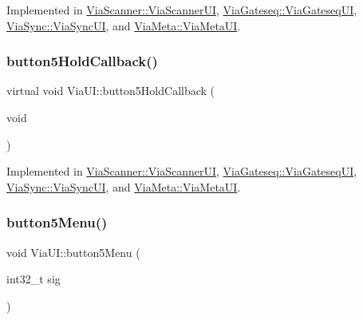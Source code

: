 Implemented in \mbox{\hyperlink{class_via_scanner_1_1_via_scanner_u_i_a337284dc48950fd3140b40ecca57122b}{Via\+Scanner\+::\+Via\+Scanner\+UI}}, \mbox{\hyperlink{class_via_gateseq_1_1_via_gateseq_u_i_a6286441705681c57d4f8535d0445b360}{Via\+Gateseq\+::\+Via\+Gateseq\+UI}}, \mbox{\hyperlink{class_via_sync_1_1_via_sync_u_i_ad02cd6e9495afcd256a3b3475809bf5b}{Via\+Sync\+::\+Via\+Sync\+UI}}, and \mbox{\hyperlink{class_via_meta_1_1_via_meta_u_i_af14bee3824185ab5a97d8745e9317370}{Via\+Meta\+::\+Via\+Meta\+UI}}.

\mbox{\label{class_via_u_i_aee783713c816e3807514ee9b06b571b0}} 
\subsubsection{\texorpdfstring{button5\+Hold\+Callback()}{button5HoldCallback()}}
{\footnotesize\ttfamily virtual void Via\+U\+I\+::button5\+Hold\+Callback (\begin{DoxyParamCaption}\item[{void}]{ }\end{DoxyParamCaption})\hspace{0.3cm}{\ttfamily [pure virtual]}}



Implemented in \mbox{\hyperlink{class_via_scanner_1_1_via_scanner_u_i_ac3f72c13ce77d58c5c8e7504083fbb65}{Via\+Scanner\+::\+Via\+Scanner\+UI}}, \mbox{\hyperlink{class_via_gateseq_1_1_via_gateseq_u_i_a81a66be2d7f162bf3a6cac5f10e6c019}{Via\+Gateseq\+::\+Via\+Gateseq\+UI}}, \mbox{\hyperlink{class_via_sync_1_1_via_sync_u_i_adb9159f6ba3275b089b52f9315963f2c}{Via\+Sync\+::\+Via\+Sync\+UI}}, and \mbox{\hyperlink{class_via_meta_1_1_via_meta_u_i_a225952a745a18a354c5ed3f890d8df0d}{Via\+Meta\+::\+Via\+Meta\+UI}}.

\mbox{\label{class_via_u_i_a0d3e2a3c83ad6781e9e403062131d205}} 
\subsubsection{\texorpdfstring{button5\+Menu()}{button5Menu()}}
{\footnotesize\ttfamily void Via\+U\+I\+::button5\+Menu (\begin{DoxyParamCaption}\item[{int32\+\_\+t}]{sig }\end{DoxyParamCaption})}

